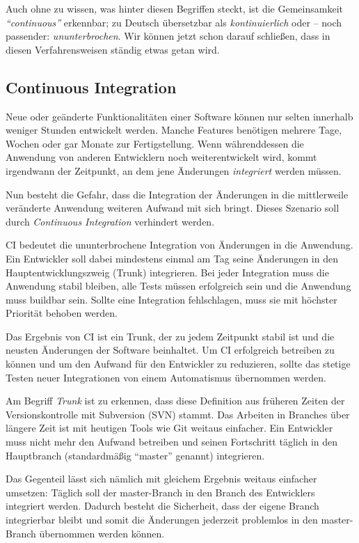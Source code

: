 Auch ohne zu wissen, was hinter diesen Begriffen steckt, ist die Gemeinsamkeit \emph{``continuous''} erkennbar; zu Deutsch übersetzbar als \emph{kontinuierlich} oder – noch passender: \emph{ununterbrochen}. Wir können jetzt schon darauf schließen, dass in diesen Verfahrensweisen ständig etwas getan wird.

\subsection{Continuous Integration}

Neue oder geänderte Funktionalitäten einer Software können nur selten innerhalb weniger Stunden entwickelt werden. Manche Features benötigen mehrere Tage, Wochen oder gar Monate zur Fertigstellung. Wenn während\-dessen die Anwendung von anderen Entwicklern noch weiterentwickelt wird, kommt irgendwann der Zeitpunkt, an dem jene Änderungen \emph{integriert} werden müssen.

Nun besteht die Gefahr, dass die Integration der Änderungen in die mittlerweile veränderte Anwendung weiteren Aufwand mit sich bringt. Dieses Szenario soll durch \emph{Continuous Integration} verhindert werden.

\ac{CI} bedeutet die ununterbrochene Integration von Än\-der\-ung\-en in die Anwendung. Ein Entwickler soll dabei mindestens einmal am Tag seine Änderungen in den Hauptentwicklungszweig (Trunk) integrieren. Bei jeder Integration muss die Anwendung stabil bleiben, alle Tests müssen erfolgreich sein und die Anwendung muss buildbar sein. Sollte eine Integration fehlschlagen, muss sie mit höchster Priorität behoben werden.

Das Ergebnis von \ac{CI} ist ein Trunk, der zu jedem Zeitpunkt stabil ist und die neusten Änderungen der Software beinhaltet. Um \ac{CI} erfolgreich betreiben zu können und um den Aufwand für den Entwickler zu reduzieren, sollte das stetige Testen neuer Integrationen von einem Automatismus übernommen werden.

Am Begriff \emph{Trunk} ist zu erkennen, dass diese Definition aus früheren Zeiten der Versionskontrolle mit Subversion (SVN) stammt. Das Arbeiten in Branches über längere Zeit ist mit heutigen Tools wie Git weitaus einfacher. Ein Entwickler muss nicht mehr den Aufwand betreiben und seinen Fortschritt täglich in den Hauptbranch (standardmäßig ``master'' genannt) integrieren.

Das Gegenteil lässt sich nämlich mit gleichem Ergebnis weitaus einfacher umsetzen: Täglich soll der master-Branch in den Branch des Entwicklers integriert werden. Dadurch besteht die Sicherheit, dass der eigene Branch integrierbar bleibt und somit die Änderungen jederzeit problemlos in den master-Branch übernommen werden können.

